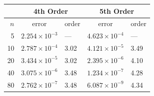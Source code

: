 \documentclass[10pt]{beamer}
\begin{document}
\begin{frame}
\begin{table}
  \end{table}
  \begin{table}
    \centering
    \begin{tabular}{r*{4}l}
      \toprule
            & \multicolumn{2}{c}{4th Order} & \multicolumn{2}{c}{5th Order}                                     \\
      \midrule
      \(n\) & \multicolumn{1}{c}{error}     & order                         & \multicolumn{1}{c}{error} & order \\
      \midrule
      5     & \( 2.254\times 10^{-3} \)     & ---                           & \( 4.623\times 10^{-4} \) & ---   \\
      10    & \( 2.787\times 10^{-4} \)     & 3.02                          & \( 4.121\times 10^{-5} \) & 3.49  \\
      20    & \( 3.434\times 10^{-5} \)     & 3.02                          & \( 2.395\times 10^{-6} \) & 4.10  \\
      40    & \( 3.075\times 10^{-6} \)     & 3.48                          & \( 1.234\times 10^{-7} \) & 4.28  \\
      80    & \( 2.762\times 10^{-7} \)     & 3.48                          & \( 6.087\times 10^{-9} \) & 4.34  \\
      \bottomrule
    \end{tabular}
  \end{table}
\end{frame}
\end{document}
